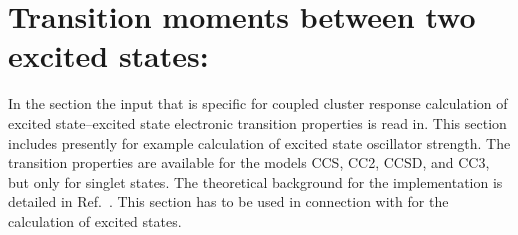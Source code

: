 
\section{Transition moments between two excited states: }
\label{sec:ccqr2r}

In the  section the input that is
specific for coupled cluster response calculation of excited state--excited state
electronic transition properties is read in.
This section includes presently for example calculation of excited state
oscillator strength.
The transition properties are available for the models CCS, CC2, CCSD, and CC3,
but only for singlet states.
The theoretical background for the implementation is 
detailed in Ref.\ \cite{Christiansen:CCLR,Christiansen:QEL}.
This section has to be used in connection with  for the 
calculation of excited states.

\begin{center}
\end{center}

